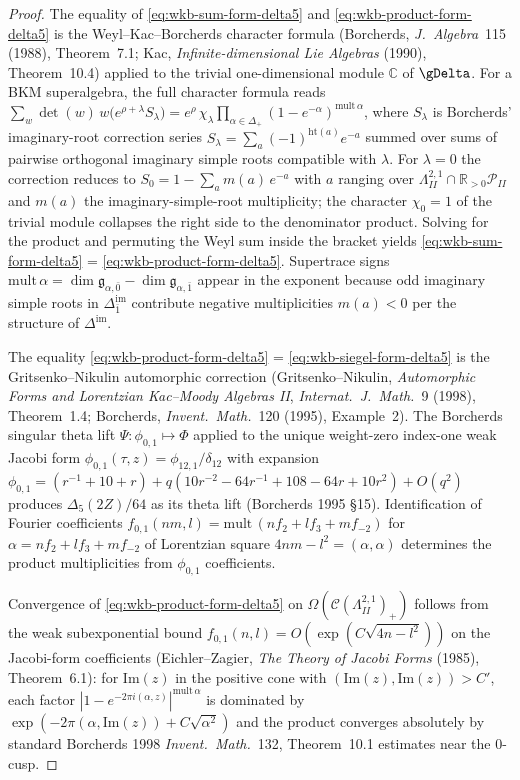 \begin{proof}
The equality of \eqref{eq:wkb-sum-form-delta5} and
\eqref{eq:wkb-product-form-delta5} is the Weyl--Kac--Borcherds
character formula (Borcherds, \emph{J.\ Algebra}~115 (1988),
Theorem~7.1; Kac, \emph{Infinite-dimensional Lie Algebras}
(1990), Theorem~10.4) applied to the trivial one-dimensional module
$\mathbb{C}$ of $\gDelta$. For a BKM superalgebra, the full character
formula reads
$\sum_w \det(w)\, w\bigl(e^{\rho + \lambda} S_\lambda\bigr) =
e^{\rho}\,\chi_\lambda \prod_{\alpha \in \Delta_+} (1 - e^{-\alpha})^{\mathrm{mult}\,\alpha}$,
where $S_\lambda$ is Borcherds' imaginary-root correction series
$S_\lambda = \sum_{a}(-1)^{\mathrm{ht}(a)} e^{-a}$ summed over
sums of pairwise orthogonal imaginary simple roots compatible with
$\lambda$. For $\lambda = 0$ the correction reduces to
$S_0 = 1 - \sum_a m(a)\, e^{-a}$ with $a$ ranging over
$\Lambda^{2,1}_{II} \cap \mathbb{R}_{>0}\mathcal{P}_{II}$ and $m(a)$
the imaginary-simple-root multiplicity; the character $\chi_0 = 1$ of
the trivial module collapses the right side to the denominator
product. Solving for the product and permuting the Weyl sum inside the
bracket yields \eqref{eq:wkb-sum-form-delta5} = \eqref{eq:wkb-product-form-delta5}.
Supertrace signs $\mathrm{mult}\,\alpha = \dim \mathfrak{g}_{\alpha,\bar 0}
- \dim \mathfrak{g}_{\alpha,\bar 1}$ appear in the exponent because odd
imaginary simple roots in $\Delta^{\mathrm{im}}_{\bar 1}$ contribute
negative multiplicities $m(a) < 0$ per the structure of
$\Delta^{\mathrm{im}}$.

The equality \eqref{eq:wkb-product-form-delta5} =
\eqref{eq:wkb-siegel-form-delta5} is the Gritsenko--Nikulin
automorphic correction (Gritsenko--Nikulin, \emph{Automorphic Forms
and Lorentzian Kac--Moody Algebras II}, \emph{Internat.\ J.\ Math.}~9
(1998), Theorem~1.4; Borcherds, \emph{Invent.\ Math.}~120 (1995),
Example~2). The Borcherds singular theta lift
$\Psi: \phi_{0,1} \mapsto \Phi$ applied to the unique weight-zero
index-one weak Jacobi form
$\phi_{0,1}(\tau, z) = \phi_{12,1}/\delta_{12}$ with expansion
$\phi_{0,1} = (r^{-1} + 10 + r) + q(10 r^{-2} - 64 r^{-1} + 108 -
64 r + 10 r^2) + O(q^2)$ produces $\Delta_5(2Z)/64$ as its theta
lift (Borcherds 1995 §15). Identification of Fourier coefficients
$f_{0,1}(nm,l) = \mathrm{mult}\,(n f_2 + l f_3 + m f_{-2})$
for $\alpha = n f_2 + l f_3 + m f_{-2}$ of Lorentzian square
$4nm - l^2 = (\alpha,\alpha)$ determines the product multiplicities
from $\phi_{0,1}$ coefficients.

Convergence of \eqref{eq:wkb-product-form-delta5} on
$\Omega(\mathcal{C}(\Lambda^{2,1}_{II})_+)$ follows from the weak
subexponential bound $f_{0,1}(n,l) = O(\exp(C \sqrt{4n - l^2}))$
on the Jacobi-form coefficients (Eichler--Zagier, \emph{The Theory
of Jacobi Forms} (1985), Theorem~6.1): for $\mathrm{Im}(z)$ in the
positive cone with $(\mathrm{Im}(z), \mathrm{Im}(z)) > C'$, each
factor $|1 - e^{-2\pi i(\alpha, z)}|^{\mathrm{mult}\,\alpha}$ is
dominated by $\exp(-2\pi(\alpha, \mathrm{Im}(z)) + C\sqrt{\alpha^2})$
and the product converges absolutely by standard Borcherds 1998
\emph{Invent.\ Math.}~132, Theorem~10.1 estimates near the
$0$-cusp.


\end{proof}
